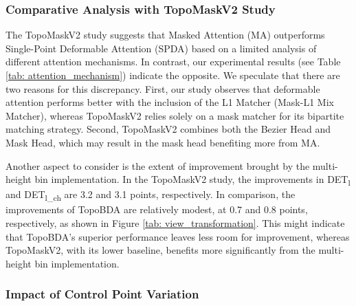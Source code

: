 \subsubsection{Comparative Analysis with TopoMaskV2 Study}
The TopoMaskV2 study \cite{kalfaoglu2024topomaskv2} suggests that Masked Attention (MA) outperforms Single-Point Deformable Attention (SPDA) based on a limited analysis of different attention mechanisms. In contrast, our experimental results (see Table \ref{tab: attention_mechanism}) indicate the opposite. We speculate that there are two reasons for this discrepancy. First, our study observes that deformable attention performs better with the inclusion of the L1 Matcher (Mask-L1 Mix Matcher), whereas TopoMaskV2 relies solely on a mask matcher for its bipartite matching strategy. Second, TopoMaskV2 combines both the Bezier Head and Mask Head, which may result in the mask head benefiting more from MA.

Another aspect to consider is the extent of improvement brought by the multi-height bin implementation. In the TopoMaskV2 study, the improvements in DET\textsubscript{l} and DET\textsubscript{l\_ch} are 3.2 and 3.1 points, respectively. In comparison, the improvements of TopoBDA are relatively modest, at 0.7 and 0.8 points, respectively, as shown in Figure \ref{tab: view_transformation}. This might indicate that TopoBDA's superior performance leaves less room for improvement, whereas TopoMaskV2, with its lower baseline, benefits more significantly from the multi-height bin implementation.

\subsubsection{Impact of Control Point Variation}
\label{sup_sec: impact_of_control_points}

\begin{table}[t]
\centering
\caption{Performance impact of varying the number of control points on road topology understanding in Subset-A of OpenLane-V2, evaluated using the V1.1m baseline.}
\label{sup_table: impact_of_control_points}
\end{table}

